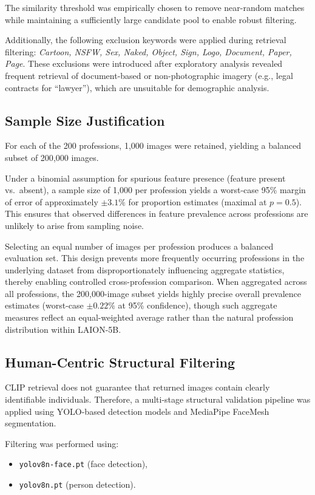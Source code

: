 The similarity threshold was empirically chosen to remove near-random matches while maintaining a sufficiently large candidate pool to enable robust filtering.

Additionally, the following exclusion keywords were applied during retrieval filtering: \emph{Cartoon, NSFW, Sex, Naked, Object, Sign, Logo, Document, Paper, Page}. These exclusions were introduced after exploratory analysis revealed frequent retrieval of document-based or non-photographic imagery (e.g., legal contracts for ``lawyer''), which are unsuitable for demographic analysis.

\subsection{Sample Size Justification}

For each of the 200 professions, 1{,}000 images were retained, yielding a balanced subset of 200{,}000 images.

Under a binomial assumption for spurious feature presence (feature present vs.\ absent), a sample size of 1{,}000 per profession yields a worst-case 95\% margin of error of approximately $\pm 3.1\%$ for proportion estimates (maximal at $p = 0.5$). This ensures that observed differences in feature prevalence across professions are unlikely to arise from sampling noise.

Selecting an equal number of images per profession produces a balanced evaluation set. This design prevents more frequently occurring professions in the underlying dataset from disproportionately influencing aggregate statistics, thereby enabling controlled cross-profession comparison. When aggregated across all professions, the 200{,}000-image subset yields highly precise overall prevalence estimates (worst-case $\pm 0.22\%$ at 95\% confidence), though such aggregate measures reflect an equal-weighted average rather than the natural profession distribution within LAION-5B.

\subsection{Human-Centric Structural Filtering}

CLIP retrieval does not guarantee that returned images contain clearly identifiable individuals. Therefore, a multi-stage structural validation pipeline was applied using YOLO-based detection models and MediaPipe FaceMesh segmentation.

Filtering was performed using:
\begin{itemize}
	\item \texttt{yolov8n-face.pt} (face detection),
	\item \texttt{yolov8n.pt} (person detection).
\end{itemize}

